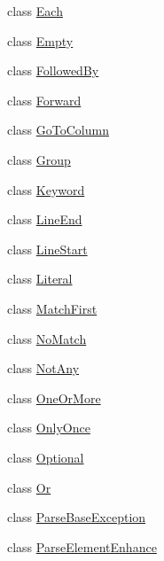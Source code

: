 \begin{DoxyCompactItemize}
\item 
class \hyperlink{classpkg__resources_1_1__vendor_1_1pyparsing_1_1_each}{Each}
\item 
class \hyperlink{classpkg__resources_1_1__vendor_1_1pyparsing_1_1_empty}{Empty}
\item 
class \hyperlink{classpkg__resources_1_1__vendor_1_1pyparsing_1_1_followed_by}{Followed\+By}
\item 
class \hyperlink{classpkg__resources_1_1__vendor_1_1pyparsing_1_1_forward}{Forward}
\item 
class \hyperlink{classpkg__resources_1_1__vendor_1_1pyparsing_1_1_go_to_column}{Go\+To\+Column}
\item 
class \hyperlink{classpkg__resources_1_1__vendor_1_1pyparsing_1_1_group}{Group}
\item 
class \hyperlink{classpkg__resources_1_1__vendor_1_1pyparsing_1_1_keyword}{Keyword}
\item 
class \hyperlink{classpkg__resources_1_1__vendor_1_1pyparsing_1_1_line_end}{Line\+End}
\item 
class \hyperlink{classpkg__resources_1_1__vendor_1_1pyparsing_1_1_line_start}{Line\+Start}
\item 
class \hyperlink{classpkg__resources_1_1__vendor_1_1pyparsing_1_1_literal}{Literal}
\item 
class \hyperlink{classpkg__resources_1_1__vendor_1_1pyparsing_1_1_match_first}{Match\+First}
\item 
class \hyperlink{classpkg__resources_1_1__vendor_1_1pyparsing_1_1_no_match}{No\+Match}
\item 
class \hyperlink{classpkg__resources_1_1__vendor_1_1pyparsing_1_1_not_any}{Not\+Any}
\item 
class \hyperlink{classpkg__resources_1_1__vendor_1_1pyparsing_1_1_one_or_more}{One\+Or\+More}
\item 
class \hyperlink{classpkg__resources_1_1__vendor_1_1pyparsing_1_1_only_once}{Only\+Once}
\item 
class \hyperlink{classpkg__resources_1_1__vendor_1_1pyparsing_1_1_optional}{Optional}
\item 
class \hyperlink{classpkg__resources_1_1__vendor_1_1pyparsing_1_1_or}{Or}
\item 
class \hyperlink{classpkg__resources_1_1__vendor_1_1pyparsing_1_1_parse_base_exception}{Parse\+Base\+Exception}
\item 
class \hyperlink{classpkg__resources_1_1__vendor_1_1pyparsing_1_1_parse_element_enhance}{Parse\+Element\+Enhance}
\item 

\end{DoxyCompactItemize}
